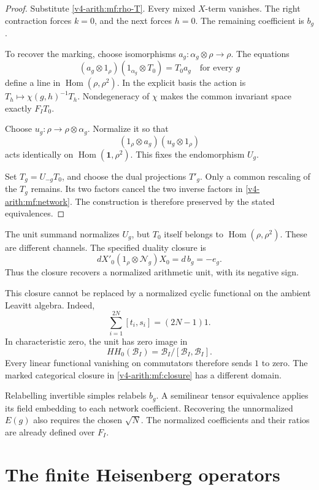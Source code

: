 \begin{proof}
Substitute \eqref{v4-arith:mf:rho-T}.
Every mixed \(X\)-term vanishes.
The right contraction forces \(k=0\), and the next forces \(h=0\).
The remaining coefficient is \(b_g\).

To recover the marking, choose isomorphisms
\(a_g:\alpha_g\otimes\rho\to\rho\).
The equations
\[
 (a_g\otimes1_\rho)(1_{\alpha_g}\otimes T_0)=T_0a_g
       \quad\text{for every }g
\]
define a line in \(\operatorname{Hom}(\rho,\rho^2)\).
In the explicit basis the action is
\(T_h\mapsto\chi(g,h)^{-1}T_h\).
Nondegeneracy of \(\chi\) makes the common invariant space
exactly \(F_IT_0\).

Choose \(u_g:\rho\to\rho\otimes\alpha_g\).
Normalize it so that
\[
 (1_\rho\otimes a_g)(u_g\otimes1_\rho)
\]
acts identically on \(\operatorname{Hom}(\mathbf1,\rho^2)\).
This fixes the endomorphism \(U_g\).

Set \(T_g=U_{-g}T_0\), and choose the dual projections \(T'_g\).
Only a common rescaling of the \(T_g\) remains.
Its two factors cancel the two inverse factors in
\eqref{v4-arith:mf:network}.
The construction is therefore preserved by the stated equivalences.
\end{proof}

The unit summand normalizes \(U_g\), but \(T_0\) itself belongs to
\(\operatorname{Hom}(\rho,\rho^2)\).
These are different channels. The specified duality closure is
\begin{equation}\label{v4-arith:mf:closure}
 dX'_0(1_\rho\otimes\mathcal N_g)X_0
       =d\,b_g=-e_g.
\end{equation}
Thus the closure recovers a normalized arithmetic unit, with its
negative sign.

This closure cannot be replaced by a normalized cyclic functional
on the ambient Leavitt algebra.
Indeed,
\[
 \sum_{i=1}^{2N}[t_i,s_i]=(2N-1)1.
\]
In characteristic zero, the unit has zero image in
\[
 HH_0(\mathcal B_I)=
       \mathcal B_I/[\mathcal B_I,\mathcal B_I].
\]
Every linear functional vanishing on commutators therefore sends
\(1\) to zero. The marked categorical closure in
\eqref{v4-arith:mf:closure} has a different domain.

Relabelling invertible simples relabels \(b_g\).
A semilinear tensor equivalence applies its field embedding to each
network coefficient. Recovering the unnormalized \(E(g)\) also
requires the chosen \(\sqrt N\). The normalized coefficients
and their ratios are already defined over \(F_I\).

\section{The finite Heisenberg operators}
\label{v4-arith:mf:operators}


